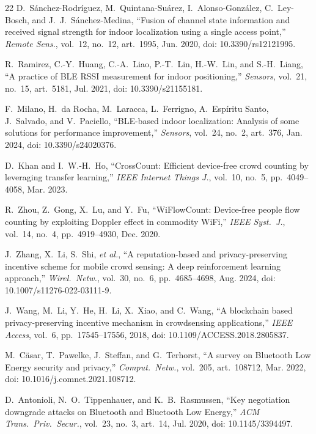 \documentclass[journal,10pt]{IEEEtran}
\begin{document}
\begin{thebibliography}{22}
 D.~S\'anchez-Rodr\'iguez, M.~Quintana-Su\'arez,
I.~Alonso-Gonz\'alez, C.~Ley-Bosch, and J.~J.~S\'anchez-Medina, ``Fusion of
channel state information and received signal strength for indoor localization
using a single access point,'' \emph{Remote Sens.}, vol.~12, no.~12,
art.~1995, Jun. 2020, doi: 10.3390/rs12121995.

 R.~Ramirez, C.-Y.~Huang, C.-A.~Liao, P.-T.~Lin, H.-W.~Lin,
and S.-H.~Liang, ``A practice of BLE RSSI measurement for indoor positioning,''
\emph{Sensors}, vol.~21, no.~15, art.~5181, Jul. 2021, doi: 10.3390/s21155181.

 F.~Milano, H.~da Rocha, M.~Laracca, L.~Ferrigno,
A.~Esp\'iritu Santo, J.~Salvado, and V.~Paciello, ``BLE-based indoor
localization: Analysis of some solutions for performance improvement,''
\emph{Sensors}, vol.~24, no.~2, art.~376, Jan. 2024, doi: 10.3390/s24020376.

 D.~Khan and I.~W.-H.~Ho, ``CrossCount: Efficient device-free
crowd counting by leveraging transfer learning,'' \emph{IEEE Internet Things
J.}, vol.~10, no.~5, pp.~4049--4058, Mar. 2023.

 R.~Zhou, Z.~Gong, X.~Lu, and Y.~Fu, ``WiFlowCount:
Device-free people flow counting by exploiting Doppler effect in commodity
WiFi,'' \emph{IEEE Syst.\ J.}, vol.~14, no.~4, pp.~4919--4930, Dec. 2020.

 J.~Zhang, X.~Li, S.~Shi, \emph{et al.}, ``A reputation-based
and privacy-preserving incentive scheme for mobile crowd sensing: A deep
reinforcement learning approach,'' \emph{Wirel.\ Netw.}, vol.~30, no.~6,
pp.~4685--4698, Aug. 2024, doi:
10.1007/s11276-022-03111-9.

 J.~Wang, M.~Li, Y.~He, H.~Li, X.~Xiao, and C.~Wang, ``A
blockchain based privacy-preserving incentive mechanism in crowdsensing
applications,'' \emph{IEEE Access}, vol.~6, pp.~17545--17556, 2018, doi:
10.1109/ACCESS.2018.2805837.

 M.~C\"asar, T.~Pawelke, J.~Steffan, and G.~Terhorst, ``A
survey on Bluetooth Low Energy security and privacy,'' \emph{Comput.\ Netw.},
vol.~205, art.~108712, Mar. 2022, doi: 10.1016/j.comnet.2021.108712.

 D.~Antonioli, N.~O.~Tippenhauer, and K.~B.~Rasmussen,
``Key negotiation downgrade attacks on Bluetooth and Bluetooth Low Energy,''
\emph{ACM Trans.\ Priv.\ Secur.}, vol.~23, no.~3, art.~14, Jul. 2020, doi:
10.1145/3394497.


\end{thebibliography}
\end{document}
